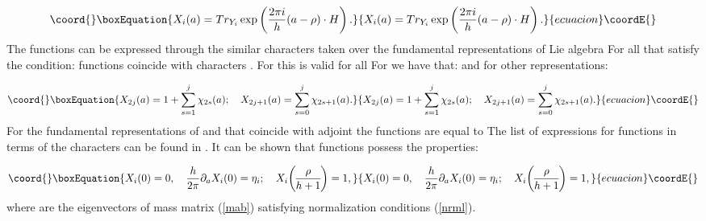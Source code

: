 \documentclass[a4paper,12pt]{article}
\begin{document}
\begin{equation}\coord{}\boxEquation{
X_i(a)=Tr_{Y_i}\exp \left( \frac{2\pi i}h(a-\rho )\cdot H\right).  \label{xi}
}{
X_i(a)=Tr_{Y_i}\exp \left( \frac{2\pi i}h(a-\rho )\cdot H\right).  }{ecuacion}\coordE{}\end{equation}
The functions \coordHE{} can be expressed through the similar characters \coordHE{} taken over the fundamental representations \coordHE{} of Lie algebra 
\coordHE{} For all \coordHE{} that satisfy the condition: \coordHE{}
functions \coordHE{} coincide with characters \coordHE{}. For \coordHE{} this is
valid for all \coordHE{} For \coordHE{} we have that: \coordHE{} and for other representations:

\begin{equation}\coord{}\boxEquation{
X_{2j}(a)=1+\sum_{s=1}^j\chi _{2s}(a);\quad X_{2j+1}(a)=\sum_{s=0}^j\chi
_{2s+1}(a).  \label{dn}
}{
X_{2j}(a)=1+\sum_{s=1}^j\chi _{2s}(a);\quad X_{2j+1}(a)=\sum_{s=0}^j\chi
_{2s+1}(a).  }{ecuacion}\coordE{}\end{equation}
For the fundamental representations of \coordHE{} and \coordHE{} that coincide with
adjoint the functions \coordHE{} are equal to \coordHE{} The list
of expressions for functions \coordHE{} in terms of the characters \coordHE{} can
be found in \cite{K}. It can be shown that functions 
\coordHE{} possess the properties:

\begin{equation}\coord{}\boxEquation{
X_i(0)=0,\quad \frac h{2\pi }\partial _aX_i(0)=\eta _i;\quad X_i
{\rho  \overwithdelims() h+1}=1,  \label{pro}
}{
X_i(0)=0,\quad \frac h{2\pi }\partial _aX_i(0)=\eta _i;\quad X_i
{\rho  \overwithdelims() h+1}=1,  }{ecuacion}\coordE{}\end{equation}
where \coordHE{} are the eigenvectors of mass matrix (\ref{mab}) satisfying
normalization conditions (\ref{nrml}).
\end{document}
